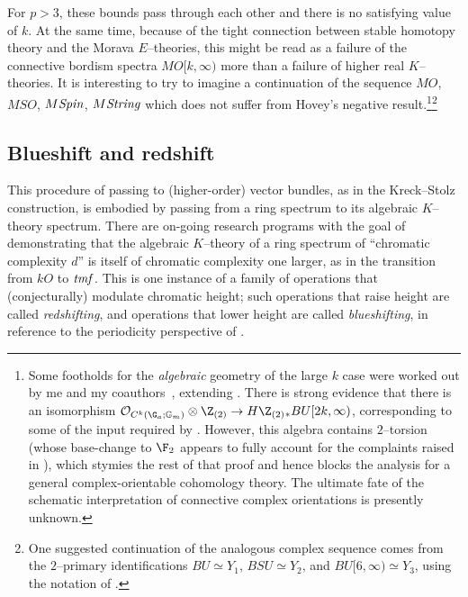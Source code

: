 For \(p > 3\), these bounds pass through each other and there is no satisfying value of \(k\).  At the same time, because of the tight connection between stable homotopy theory and the Morava \(E\)--theories, this might be read as a failure of the connective bordism spectra \(MO[k, \infty)\) more than a failure of higher real \(K\)--theories.  It is interesting to try to imagine a continuation of the sequence \(MO\), \(MSO\), \(M\mathit{Spin}\), \(M\mathit{String}\) which does not suffer from Hovey's negative result.\footnote{Some footholds for the \emph{algebraic} geometry of the large \(k\) case were worked out by me and my coauthors~\cite{HLP}, extending .  There is strong evidence that there is an isomorphism $\sheaf O_{C^k(\G_a; \Gm)} \otimes \Z_{(2)} \to H\Z_{(2)}{}_* BU[2k, \infty)$, corresponding to some of the input required by .  However, this algebra contains \(2\)--torsion (whose base-change to \(\F_2\) appears to fully account for the complaints raised in \cite[Remark 8.1]{HLP}), which stymies the rest of that proof and hence blocks the analysis for a general complex-orientable cohomology theory.  The ultimate fate of the schematic interpretation of connective complex orientations is presently unknown.}\footnote{One suggested continuation of the analogous complex sequence comes from the \(2\)--primary identifications \(BU \simeq Y_1\), \(BSU \simeq Y_2\), and \(BU[6, \infty) \simeq Y_3\), using the notation of .}








\subsection*{Blueshift and redshift}

This procedure of passing to (higher-order) vector bundles, as in the Kreck--Stolz construction, is embodied by passing from a ring spectrum to its algebraic \(K\)--theory spectrum.  There are on-going research programs with the goal of demonstrating that the algebraic \(K\)--theory of a ring spectrum of ``chromatic complexity \(d\)'' is itself of chromatic complexity one larger, as in the transition from \(kO\) to \(\mathit{tmf}\).  This is one instance of a family of operations that (conjecturally) modulate chromatic height; such operations that raise height are called \textit{redshifting}, and operations that lower height are called \textit{blueshifting}, in reference to the periodicity perspective of .

